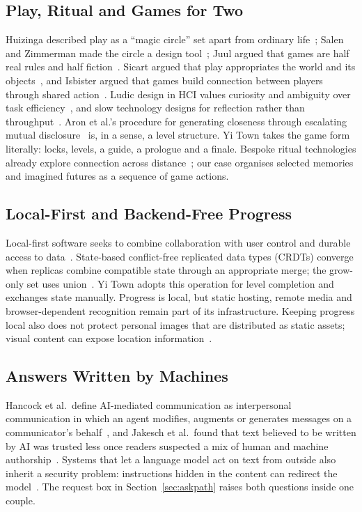 \documentclass[sigconf,nonacm]{acmart}
\newcommand{\yt}{Yi Town}
\begin{document}
\subsection{Play, Ritual and Games for Two}
Huizinga described play as a ``magic circle'' set apart from ordinary life~\cite{huizinga1955homo};
Salen and Zimmerman made the circle a design tool~\cite{salen2004rules}; Juul argued that games
are half real rules and half fiction~\cite{juul2005halfreal}. Sicart argued that play
appropriates the world and its objects~\cite{sicart2014play}, and Isbister argued that games build
connection between players through shared action~\cite{isbister2016games}. Ludic design in HCI
values curiosity and ambiguity over task efficiency~\cite{gaver2004drift,gaver2003ambiguity}, and
slow technology designs for reflection rather than throughput~\cite{hallnas2001slow,odom2012technology}.
Aron et al.'s procedure for generating closeness through escalating mutual
disclosure~\cite{aron1997closeness} is, in a sense, a level structure. \yt{} takes the game form
literally: locks, levels, a guide, a prologue and a finale. Bespoke ritual technologies
already explore connection across distance~\cite{kirk2016ritual}; our case organises
selected memories and imagined futures as a sequence of game actions.


\subsection{Local-First and Backend-Free Progress}
Local-first software seeks to combine collaboration with user control and durable access to
data~\cite{kleppmann2019localfirst}. State-based conflict-free replicated data types (CRDTs)
converge when replicas combine compatible state through an appropriate merge; the grow-only set
uses union~\cite{shapiro2011crdt}. \yt{} adopts this operation for level completion and exchanges
state manually. Progress is local, but static hosting, remote media and browser-dependent
recognition remain part of its infrastructure.
Keeping progress local also does not protect personal images that are distributed as static
assets; visual content can expose location information~\cite{yang2024geolocator}.

\subsection{Answers Written by Machines}
Hancock et al.\ define AI-mediated communication as interpersonal communication in which an
agent modifies, augments or generates messages on a communicator's
behalf~\cite{hancock2020aimc}, and Jakesch et al.\ found that text believed to be written by AI
was trusted less once readers suspected a mix of human and machine
authorship~\cite{jakesch2019aimc}. Systems that let a language model act on text from outside
also inherit a security problem: instructions hidden in the content can redirect the
model~\cite{greshake2023injection}. The request box in Section~\ref{sec:askpath} raises both
questions inside one couple.
\end{document}
